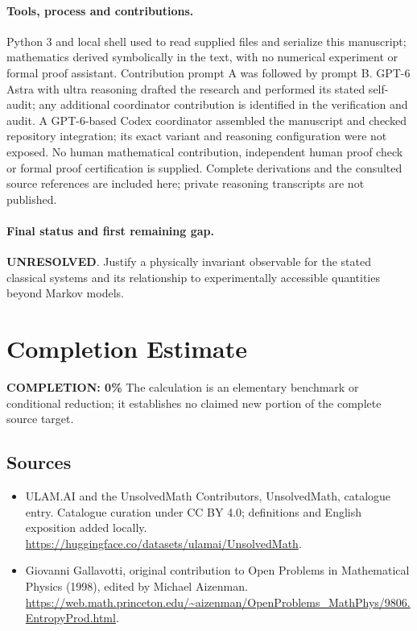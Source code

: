 \documentclass[11pt]{article}
\begin{document}
\paragraph{Tools, process and contributions.}
Python 3 and local shell used to read supplied files and serialize this manuscript; mathematics derived symbolically in the text, with no numerical experiment or formal proof assistant. Contribution prompt A was followed by prompt B. GPT-6 Astra with ultra reasoning drafted the research and performed its stated self-audit; any additional coordinator contribution is identified in the verification and audit. A GPT-6-based Codex coordinator assembled the manuscript and checked repository integration; its exact variant and reasoning configuration were not exposed. No human mathematical contribution, independent human proof check or formal proof certification is supplied. Complete derivations and the consulted source references are included here; private reasoning transcripts are not published.

\paragraph{Final status and first remaining gap.}
\textbf{UNRESOLVED}. Justify a physically invariant observable for the stated classical systems and its relationship to experimentally accessible quantities beyond Markov models.

\section{Completion Estimate}
\noindent\textbf{COMPLETION: 0\%}
The calculation is an elementary benchmark or conditional reduction; it establishes no claimed new portion of the complete source target.

\subsection{Sources}
\begin{itemize}
\item[\hypertarget{source:statement:1}{S1}] ULAM.AI and the UnsolvedMath Contributors, UnsolvedMath, catalogue entry. Catalogue curation under CC BY 4.0; definitions and English exposition added locally.
\url{https://huggingface.co/datasets/ulamai/UnsolvedMath}.
\item[\hypertarget{source:statement:2}{S2}] Giovanni Gallavotti, original contribution to Open Problems in Mathematical Physics (1998), edited by Michael Aizenman.
\url{https://web.math.princeton.edu/~aizenman/OpenProblems_MathPhys/9806.EntropyProd.html}.
\end{itemize}
\label{end:statement}
\end{document}
